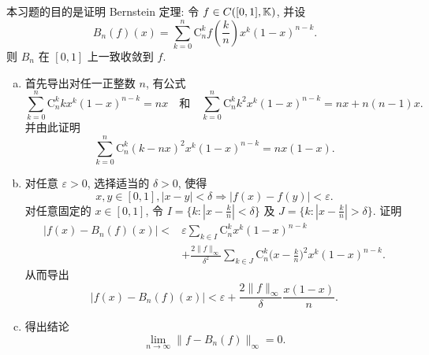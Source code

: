 \begin{exercise}[14]
  本习题的目的是证明 Bernstein 定理: 令 $f\in C([0,1], \mathbb{K})$, 并设
  \[ B_{n}(f)(x)=\sum_{k=0}^{n} \mathrm{C}_{n}^{k} f\left(\frac{k}{n}\right) x^{k}(1-x)^{n-k}.\]
  则 $B_{n}$ 在 $[0,1]$ 上一致收敛到 $f$.
  \begin{enumerate}[(a)]
    \item 首先导出对任一正整数 $n$, 有公式
      \[\sum_{k=0}^{n} \mathrm{C}_{n}^{k} k x^{k}(1-x)^{n-k}=nx \quad\text{和}\quad\sum_{k=0}^{n} \mathrm{C}_{n}^{k} k^2 x^k(1-x)^{n-k}=nx+n(n-1)x.\]
      并由此证明
      \[\sum_{k=0}^{n} \mathrm{C}_{n}^{k}(k-nx)^2 x^k (1-x)^{n-k}=nx(1-x).\]
    \item 对任意 $\varepsilon>0$, 选择适当的 $\delta>0$, 使得
      \[x, y \in[0,1],|x-y|<\delta \Rightarrow|f(x)-f(y)|<\varepsilon.\]
      对任意固定的 $x\in [0,1]$, 令 $I=\{k:|x-\frac{k}{n}|<\delta\}$
      及 $J=\{k:|x-\frac{k}{n}|>\delta\}$. 证明
      \begin{align*}
          |f(x)-B_n(f)(x)|<{}
          & \varepsilon\sum_{k\in I}\mathrm{C}_n^k x^k(1-x)^{n-k} \\
          & +\frac{2\|f\|_{\infty}}{\delta^2}\sum_{k\in J}\mathrm{C}_n^k \biggl(x-\frac{k}{n}\biggr)^2x^k(1-x)^{n-k}.
      \end{align*}
      从而导出
      \[|f(x)-B_n(f)(x)|<\varepsilon+\frac{2\|f\|_{\infty}}{\delta}\frac{x(1-x)}{n}.\]
    \item 得出结论
      \[\lim_{n\to\infty}\|f-B_n(f)\|_{\infty}=0.\]
  \end{enumerate}
\end{exercise}

